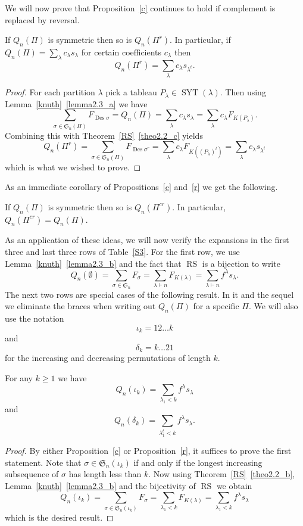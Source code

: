 \documentclass[ALCO,ThmDefs,Unicode,epreuves]{cedram}
\DeclareMathOperator{\RS}{RS}
\newcommand{\emp}{\emptyset}
\newcommand{\ptn}{\vdash}
\newcommand{\de}{\delta}
\newcommand{\io}{\iota}
\newcommand{\la}{\lambda}
\newcommand{\si}{\sigma}
\newcommand{\fS}{{\mathfrak S}}
\DeclareMathOperator{\Des}{Des}
\DeclareMathOperator{\SYT}{SYT}
\begin{document}
We will now prove that Proposition~\ref{c} continues to hold if complement is replaced by reversal.
\begin{prop}
\label{r}
If $Q_n(\Pi)$ is symmetric then so is $Q_n(\Pi^r)$. In particular, if $Q_n(\Pi)=\sum_\la c_\la s_\la$ for certain coefficients $c_\la$ then
\[
Q_n(\Pi^r)=\sum_\la c_\la s_{\la^t}.
\]
\end{prop}
\begin{proof}
For each partition $\la$ pick a tableau $P_\la\in\SYT(\la)$. Then using Lemma~\ref{knuth}~\eqref{lemma2.3_a} we have
\[
\sum_{\si\in\fS_n(\Pi)} F_{\Des\si} = Q_n(\Pi) = \sum_\la c_\la s_\la= \sum_\la c_\la F_{K(P_\la)}.
\]
Combining this with Theorem~\ref{RS}~\eqref{theo2.2_c} yields
\[
Q_n(\Pi^r)=\sum_{\si\in\fS_n(\Pi)} F_{\Des\si^r} = \sum_\la c_\la F_{K((P_\la)^t)}=\sum_\la c_\la s_{\la^t}
\]
which is what we wished to prove.
\end{proof}

As an immediate corollary of Propositions~\ref{c} and~\ref{r} we get the following. 
\begin{prop} 
\label{cr}
If $Q_n(\Pi)$ is symmetric then so is $Q_n(\Pi^{cr})$. In particular, $Q_n(\Pi^{cr})=Q_n(\Pi)$.
\end{prop}

As an application of these ideas, we will now verify the expansions in the first three and last three rows of Table~\ref{S3}. For the first row, we use Lemma~\ref{knuth}~\eqref{lemma2.3_b} and the fact that $\RS$ is a bijection to write
\[
Q_n(\emp)=\sum_{\si\in\fS_n} F_\si = \sum_{\la\ptn n} F_{K(\la)} = \sum_{\la\ptn n} f^\la s_\la.
\]
The next two rows are special cases of the following result. In it and the sequel we eliminate the braces when writing out $Q_n(\Pi)$ for a specific $\Pi$. We will also use the notation
\[
\io_k = 12\dots k
\]
and
\[
\de_k = k \dots 21
\]
for the increasing and decreasing permutations of length $k$.
\begin{prop}
\label{iode}
For any $k\ge 1$ we have
\[
Q_n(\io_k) = \sum_{\la_1<k} f^\la s_\la
\]
and
\[
Q_n(\de_k) = \sum_{\la_1^t<k} f^\la s_\la.
\]
\end{prop}
\begin{proof}
By either Proposition~\ref{c} or Proposition~\ref{r}, it suffices to prove the first statement. Note that $\si\in\fS_n(\io_k)$ if and only if the longest increasing subsequence of $\si$ has length less than $k$. Now using Theorem~\ref{RS}~\eqref{theo2.2_b}, Lemma~\ref{knuth}~\eqref{lemma2.3_b} and the bijectivity of $\RS$ we obtain
\[
Q_n(\io_k) =\sum_{\si\in\fS_n(\io_k)} F_\si = \sum_{\la_1<k} F_{K(\la)} = \sum_{\la_1<k} f^\la s_\la
\]
which is the desired result.
\end{proof}
\end{document}
